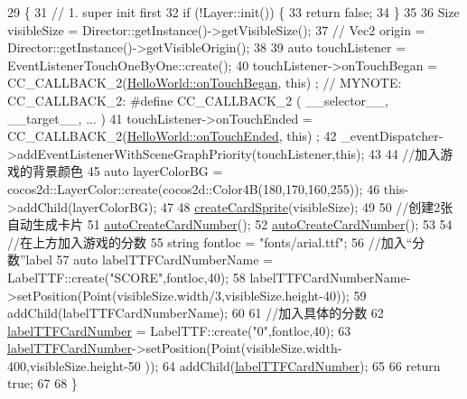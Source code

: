 \begin{DoxyCode}
29                        \{
31         \textcolor{comment}{// 1. super init first}
32         \textcolor{keywordflow}{if} (!Layer::init()) \{
33             \textcolor{keywordflow}{return} \textcolor{keyword}{false};
34         \}
35         
36         Size visibleSize = Director::getInstance()->getVisibleSize();
37         \textcolor{comment}{//    Vec2 origin = Director::getInstance()->getVisibleOrigin();}
38         
39         \textcolor{keyword}{auto} touchListener = EventListenerTouchOneByOne::create();
40         touchListener->onTouchBegan = CC\_CALLBACK\_2(\hyperlink{classallenlsy_1_1game2048_1_1_hello_world_a0cc62fe1173f141d60833be4804f97d9}{HelloWorld::onTouchBegan}, \textcolor{keyword}{this})
      ; \textcolor{comment}{// MYNOTE: CC\_CALLBACK\_2: #define CC\_CALLBACK\_2    (       \_\_selector\_\_, \_\_target\_\_, ... )}
41         touchListener->onTouchEnded = CC\_CALLBACK\_2(\hyperlink{classallenlsy_1_1game2048_1_1_hello_world_a99042e68bb9365cdb764cc9c3d9e6197}{HelloWorld::onTouchEnded}, \textcolor{keyword}{this})
      ;
42         \_eventDispatcher->addEventListenerWithSceneGraphPriority(touchListener,\textcolor{keyword}{this});
43         
44         \textcolor{comment}{//加入游戏的背景颜色}
45         \textcolor{keyword}{auto} layerColorBG = cocos2d::LayerColor::create(cocos2d::Color4B(180,170,160,255));
46         this->addChild(layerColorBG);
47         
48         \hyperlink{classallenlsy_1_1game2048_1_1_hello_world_ad55dd12c9e76eba2e7c79dafbd103e54}{createCardSprite}(visibleSize);
49         
50         \textcolor{comment}{//创建2张自动生成卡片}
51         \hyperlink{classallenlsy_1_1game2048_1_1_hello_world_af1c795b6d174c1d6d6472e0fe703e648}{autoCreateCardNumber}();
52         \hyperlink{classallenlsy_1_1game2048_1_1_hello_world_af1c795b6d174c1d6d6472e0fe703e648}{autoCreateCardNumber}();
53         
54         \textcolor{comment}{//在上方加入游戏的分数}
55         \textcolor{keywordtype}{string} fontloc = \textcolor{stringliteral}{"fonts/arial.ttf"};
56         \textcolor{comment}{//加入“分数”label}
57         \textcolor{keyword}{auto} labelTTFCardNumberName = LabelTTF::create(\textcolor{stringliteral}{"SCORE"},fontloc,40);
58         labelTTFCardNumberName->setPosition(Point(visibleSize.width/3,visibleSize.height-40));
59         addChild(labelTTFCardNumberName);
60         
61         \textcolor{comment}{//加入具体的分数}
62         \hyperlink{classallenlsy_1_1game2048_1_1_hello_world_a08dbd0e2c7f6c6ac01f47e157d3b3911}{labelTTFCardNumber} = LabelTTF::create(\textcolor{stringliteral}{"0"},fontloc,40);
63         \hyperlink{classallenlsy_1_1game2048_1_1_hello_world_a08dbd0e2c7f6c6ac01f47e157d3b3911}{labelTTFCardNumber}->setPosition(Point(visibleSize.width-400,visibleSize.height-50
      ));
64         addChild(\hyperlink{classallenlsy_1_1game2048_1_1_hello_world_a08dbd0e2c7f6c6ac01f47e157d3b3911}{labelTTFCardNumber});
65         
66         \textcolor{keywordflow}{return} \textcolor{keyword}{true};
67 
68     \}
\end{DoxyCode}

